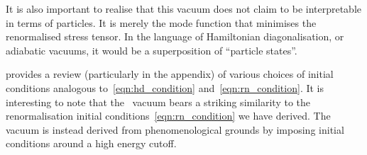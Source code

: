 It is also important to realise that this vacuum does not claim to be interpretable in terms of particles. It is merely the mode function that minimises the renormalised stress tensor. In the language of Hamiltonian diagonalisation, or adiabatic vacuums, it would be a superposition of ``particle states''.

\cite{vacuum_choice} provides a review (particularly in the appendix) of various choices of initial conditions analogous to~\eqref{eqn:hd_condition} and~\eqref{eqn:rn_condition}. It is interesting to note that the~\cite{Danielsson} vacuum bears a striking similarity to the renormalisation initial conditions~\eqref{eqn:rn_condition} we have derived. The~\cite{Danielsson} vacuum \citep[also discussed by][]{Danielsson2} is instead derived from phenomenological grounds by imposing initial conditions around a high energy cutoff.

